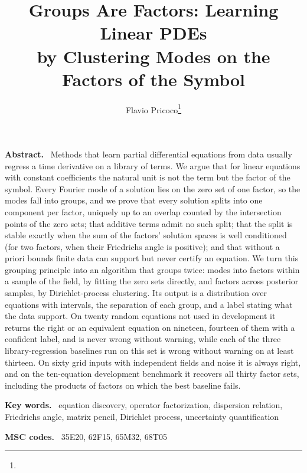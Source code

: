 \documentclass[11pt]{article}
\title{Groups Are Factors: Learning Linear PDEs\\by Clustering Modes on the Factors of the Symbol}
\author{Flavio Pricoco\thanks{\email{flaflapr@gmail.com}}}
\newenvironment{keywords}{\par\smallskip\noindent\textbf{Key words.}\ }{\par}
\newenvironment{MSCcodes}{\par\smallskip\noindent\textbf{MSC codes.}\ }{\par}
\renewenvironment{abstract}{\par\small\noindent\textbf{Abstract.}\ }{\par\normalsize}
\theoremstyle{plain}
\theoremstyle{definition}
\theoremstyle{remark}
\begin{document}
\maketitle

\begin{abstract}
Methods that learn partial differential equations from data usually regress a time derivative on a library of terms.
We argue that for linear equations with constant coefficients the natural unit is not the term but the factor of the
symbol. Every Fourier mode of a solution lies on the zero set of one factor, so the modes fall into groups, and we prove
that every solution splits into one component per factor, uniquely up to an overlap counted by the intersection points
of the zero sets; that additive terms admit no such split; that the split is stable exactly when the sum of the
factors' solution spaces is well conditioned (for two factors, when their Friedrichs angle is positive); and that
without a priori bounds finite data can support but never certify an equation. We turn this grouping principle into an
algorithm that groups twice: modes into factors within a sample of the field, by fitting the zero sets directly, and
factors across posterior samples, by Dirichlet-process clustering. Its output is a distribution over equations with
intervals, the separation of each group, and a label stating what the data support. On twenty random equations not used
in development it returns the right or an equivalent equation on nineteen, fourteen of them with a confident label, and
is never wrong without warning, while
each of the three library-regression baselines run on this set is wrong without warning on at least thirteen. On sixty
grid inputs with independent fields and noise it is always right, and on the ten-equation development benchmark it
recovers all thirty factor sets, including the products of factors on which the
best baseline fails.
\end{abstract}

\begin{keywords}
equation discovery, operator factorization, dispersion relation, Friedrichs angle, matrix pencil, Dirichlet process,
uncertainty quantification
\end{keywords}

\begin{MSCcodes}
35E20, 62F15, 65M32, 68T05
\end{MSCcodes}


\end{document}
